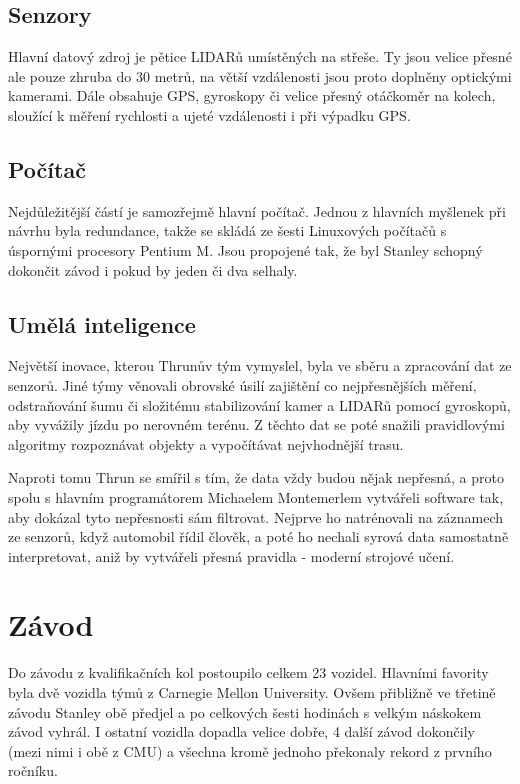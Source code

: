 \documentclass[12pt]{article}
\begin{document}
\subsection{Senzory}
Hlavní datový zdroj je pětice LIDARů umístěných na střeše. Ty jsou velice přesné ale pouze zhruba do 30
metrů, na větší vzdálenosti jsou proto doplněny optickými kamerami. Dále obsahuje GPS, gyroskopy či
velice přesný otáčkoměr na kolech, sloužící k měření rychlosti a ujeté vzdálenosti i při výpadku GPS.

\subsection{Počítač}
Nejdůležitější částí je samozřejmě hlavní počítač. Jednou z hlavních myšlenek při návrhu byla redundance,
takže se skládá ze šesti Linuxových počítačů s úspornými procesory Pentium M. Jsou propojené tak, že byl
Stanley schopný dokončit závod i pokud by jeden či dva selhaly. 


\subsection{Umělá inteligence}
Největší inovace, kterou Thrunův tým vymyslel, byla ve sběru a zpracování dat ze senzorů. Jiné týmy
věnovali obrovské úsilí zajištění co nejpřesnějších měření, odstraňování šumu či složitému stabilizování
kamer a LIDARů pomocí gyroskopů, aby vyvážily jízdu po nerovném terénu. Z těchto dat se poté snažili
pravidlovými algoritmy rozpoznávat objekty a vypočítávat nejvhodnější trasu.

Naproti tomu Thrun se smířil s tím, že data vždy budou nějak nepřesná, a proto spolu s hlavním programátorem
Michaelem Montemerlem vytvářeli software tak, aby dokázal tyto nepřesnosti sám filtrovat. Nejprve ho
natrénovali na záznamech ze senzorů, když automobil řídil člověk, a poté ho nechali syrová data samostatně
interpretovat, aniž by vytvářeli přesná pravidla - moderní strojové učení.

\section{Závod}
Do závodu z kvalifikačních kol postoupilo celkem 23 vozidel. Hlavními favority byla dvě vozidla týmů
z Carnegie Mellon University. Ovšem přibližně ve třetině závodu Stanley obě předjel a po celkových šesti
hodinách s velkým náskokem závod vyhrál. I ostatní vozidla dopadla velice dobře, 4 další závod dokončily
(mezi nimi i obě z CMU) a všechna kromě jednoho překonaly rekord z prvního ročníku.
\end{document}
